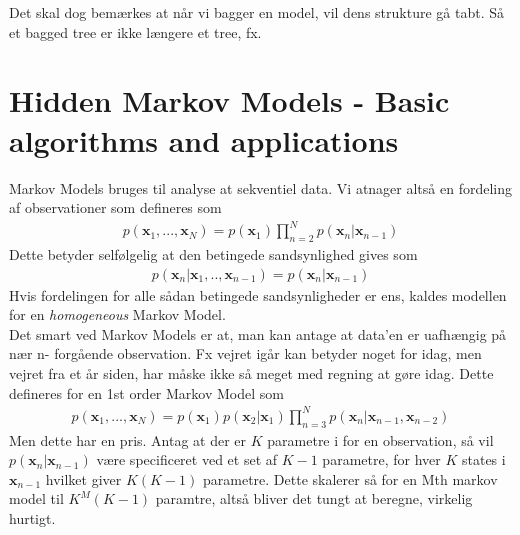\documentclass[paper=a4, fontsize=11pt]{scrartcl} %
\numberwithin{equation}{section} %
\numberwithin{figure}{section} %
\numberwithin{table}{section} %
\begin{document}
	Det skal dog bemærkes at når vi bagger en model, vil dens strukture gå tabt. Så et bagged tree er ikke længere et tree, fx. 
	
	\newpage
	
	\section*{Hidden Markov Models - Basic algorithms and applications}
	
	Markov Models bruges til analyse at sekventiel data. Vi atnager altså en fordeling af observationer som defineres som
	\begin{align*}
	p(\mathbf{x}_1,...,\mathbf{x}_N)=p(\mathbf{x}_1)\prod^N_{n=2}p(\mathbf{x}_n|\mathbf{x}_{n-1})
	\end{align*}
	Dette betyder selfølgelig at den betingede sandsynlighed gives som
	\begin{align*}
	p(\mathbf{x}_n|\mathbf{x}_1,..,\mathbf{x}_{n-1})=p(\mathbf{x}_n|\mathbf{x}_{n-1})
	\end{align*}
	Hvis fordelingen for alle sådan betingede sandsynligheder er ens, kaldes modellen for en \textit{homogeneous} Markov Model. \\
	
	Det smart ved Markov Models er at, man kan antage at data'en er uafhængig på nær n- forgående observation. Fx vejret igår kan betyder noget for idag, men vejret fra et år siden, har måske ikke så meget med regning at gøre idag. Dette defineres for en 1st order Markov Model som
	\begin{align*}
	p(\mathbf{x}_1,...,\mathbf{x}_N)=p(\mathbf{x}_1)p(\mathbf{x}_2|\mathbf{x}_1)\prod_{n=3}^{N}p(\mathbf{x}_n|\mathbf{x}_{n-1},\mathbf{x}_{n-2})
	\end{align*}
	Men dette har en pris. Antag at der er $K$ parametre i for en observation, så vil $p(\mathbf{x}_n|\mathbf{x}_{n-1})$ være specificeret ved et set af $K-1$ parametre, for hver $K$ states i $\mathbf{x}_{n-1}$ hvilket giver $K(K-1)$ parametre. Dette skalerer så for en Mth markov model til $K^M(K-1)$ paramtre, altså bliver det tungt at beregne, virkelig hurtigt. \\
	
\end{document}
